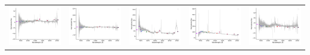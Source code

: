 \begin{center}
\begin{longtable}{l l l l l }
    \includegraphics[width=0.19\linewidth, clip]{Figs/Figs-lamost/spec-57336-EG034838N001340M01_sp09-025-STRIPE82-0084-014280.pdf} & \includegraphics[width=0.19\linewidth, clip]{Figs/Figs-lamost/spec-57336-EG034838N001340M01_sp13-222-STRIPE82-0086-013095.pdf} & \includegraphics[width=0.19\linewidth, clip]{Figs/Figs-lamost/spec-57336-EG034838N001340M01_sp14-093-STRIPE82-0080-039699.pdf} & \includegraphics[width=0.19\linewidth, clip]{Figs/Figs-lamost/spec-57336-EG222106N010205M01_sp03-208-STRIPE82-0136-036365.pdf} & \includegraphics[width=0.19\linewidth, clip]{Figs/Figs-lamost/spec-57387-EG010159N023133M01_sp02-162-STRIPE82-0020-062391.pdf} \\

\end{longtable}
\end{center}

